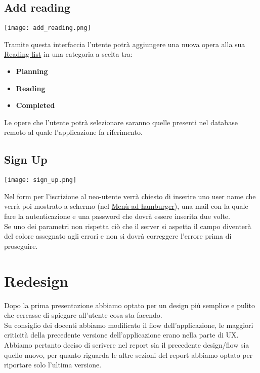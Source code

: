 \documentclass[../Assignment-3-LPSMT.tex]{subfiles}
\begin{document}
\subsection{Add reading}

\begin{center}
   \texttt{[image: add\_reading.png]}
\end{center}

Tramite questa interfaccia l'utente potrà aggiungere una nuova opera alla sua \hyperref[sec:reading_list]{Reading list} in una categoria a scelta tra:
\begin{itemize}
   \item \textbf{Planning}
   \item \textbf{Reading}
   \item \textbf{Completed}
\end{itemize}
Le opere che l'utente potrà selezionare saranno quelle presenti nel database remoto al quale l'applicazione fa riferimento.

\subsection{Sign Up}

\begin{center}
   \texttt{[image: sign\_up.png]}
\end{center}

Nel form per l'iscrizione al neo-utente verrà chiesto di inserire uno user name che verrà poi mostrato a schermo (nel \hyperref[sec:hamburger]{Menù ad hamburger}), una mail con la quale fare la autenticazione e una password che dovrà essere inserita due volte.\\
Se uno dei parametri non rispetta ciò che il server si aspetta il campo diventerà del colore assegnato agli errori e non si dovrà correggere l'errore prima di proseguire.

\section{Redesign}

Dopo la prima presentazione abbiamo optato per un design più semplice e pulito che cercasse di spiegare all'utente cosa sta facendo.\\
Su consiglio dei docenti abbiamo modificato il flow dell'applicazione, le maggiori criticità della precedente versione dell'applicazione erano nella parte di UX.\\
Abbiamo pertanto deciso di scrivere nel report  sia il precedente design/flow sia quello nuovo, per quanto riguarda le altre sezioni del report abbiamo optato per riportare solo l'ultima versione.
\end{document}
